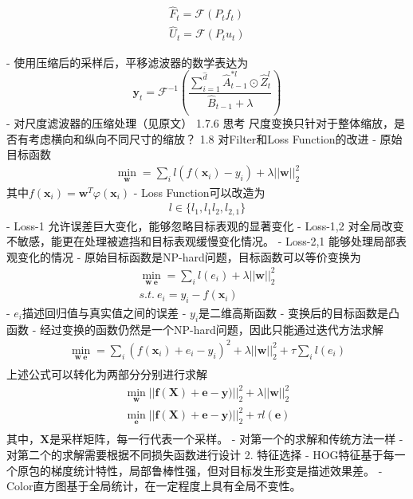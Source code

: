 \begin{align}
\hat{F}_t=\mathcal{F}(P_tf_t)\\
\hat{U}_t=\mathcal{F}(P_tu_t)
\end{align}

- 使用压缩后的采样后，平移滤波器的数学表达为
\begin{equation}
\mathbf{y}_t={\mathcal{F}^{-1}}(\frac{\sum_{i=1}^{\hat{d}}{\hat{A}^{*l}_{t-1}} \odot \hat{Z}^{l}_{t}}{\hat{B}_{t-1}+\lambda})
\end{equation}
- 对尺度滤波器的压缩处理（见原文）
 1.7.6 思考
尺度变换只针对于整体缩放，是否有考虑横向和纵向不同尺寸的缩放？
1.8 对Filter和Loss Function的改进
- 原始目标函数
\begin{align}
\min_\mathbf{w}=\sum_{i}l(f(\mathbf{x}_i)-y_i)+\lambda||\mathbf{w}||^2_2
\end{align}
其中$f(\mathbf{x}_i)=\mathbf{w}^T\varphi(\mathbf{x}_i)$
- Loss Function可以改造为
\begin{align}
l \in \{l_1, l_1l_2, l_{2,1}\}
\end{align}
- Loss-1 允许误差巨大变化，能够忽略目标表观的显著变化
- Loss-1,2 对全局改变不敏感，能更在处理被遮挡和目标表观缓慢变化情况。
- Loss-2,1 能够处理局部表观变化的情况
- 原始目标函数是NP-hard问题，目标函数可以等价变换为
\begin{align}
\min_{\mathbf{w}\ \mathbf{e}}=\sum_{i}l(e_i)+\lambda||\mathbf{w}||^2_2\\
s.t.\ e_i=y_i - f(\mathbf{x}_i)
\end{align}
- $e_i$描述回归值与真实值之间的误差
- $y_i$是二维高斯函数
- 变换后的目标函数是凸函数
- 经过变换的函数仍然是一个NP-hard问题，因此只能通过迭代方法求解
\begin{align}
\min_{\mathbf{w}\ \mathbf{e}}=\sum_{i}(f(\mathbf{x}_i) + e_i - y_i)^2+\lambda||\mathbf{w}||^2_2 + \tau \sum_i l(e_i)\\
\end{align}
上述公式可以转化为两部分分别进行求解
\begin{align}
\min_{\mathbf{w}}||\mathbf{f}(\mathbf{X})+\mathbf{e}-\mathbf{y})||^2_2+\lambda||\mathbf{w}||^2_2\\
\min_{\mathbf{e}}||\mathbf{f}(\mathbf{X})+\mathbf{e}-\mathbf{y})||^2_2+\tau l(\mathbf{e})\\
\end{align}
其中，$\mathbf{X}$是采样矩阵，每一行代表一个采样。
- 对第一个的求解和传统方法一样
- 对第二个的求解需要根据不同损失函数进行设计
 2. 特征选择
- HOG特征基于每一个原包的梯度统计特性，局部鲁棒性强，但对目标发生形变是描述效果差。
- Color直方图基于全局统计，在一定程度上具有全局不变性。


